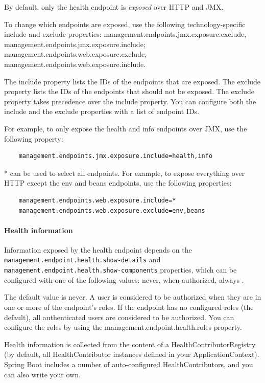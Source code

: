\documentclass{scrartcl}
\begin{document}
By default, only the health endpoint is \textit{exposed} over HTTP and JMX.

To change which endpoints are exposed, use the following technology-specific include and exclude properties: management.endpoints.jmx.exposure.exclude,
management.endpoints.jmx.exposure.include; management.endpoints.web.exposure.exclude, management.endpoints.web.exposure.include.

The include property lists the IDs of the endpoints that are exposed. The exclude property lists the IDs of the endpoints that should not be exposed. The exclude property takes precedence over the include property. You can configure both the include and the exclude properties with a list of endpoint IDs.

For example, to only expose the health and info endpoints over JMX, use the following property:

\begin{lstlisting}
    management.endpoints.jmx.exposure.include=health,info
\end{lstlisting}

* can be used to select all endpoints. For example, to expose everything over HTTP except the env and beans endpoints, use the following properties:

\begin{lstlisting}
    management.endpoints.web.exposure.include=*
    management.endpoints.web.exposure.exclude=env,beans

\end{lstlisting}

\paragraph{Health information}

Information exposed by the health endpoint depends on the \lstinline|management.endpoint.health.show-details| and \lstinline|management.endpoint.health.show-components| properties, which can be configured with one of the following values: never, when-authorized, always
.

The default value is never. A user is considered to be authorized when they are in one or more of the endpoint’s roles. If the endpoint has no configured roles (the default), all authenticated users are considered to be authorized. You can configure the roles by using the management.endpoint.health.roles property.

Health information is collected from the content of a HealthContributorRegistry (by default, all HealthContributor instances defined in your ApplicationContext). Spring Boot includes a number of auto-configured HealthContributors, and you can also write your own.
\end{document}
